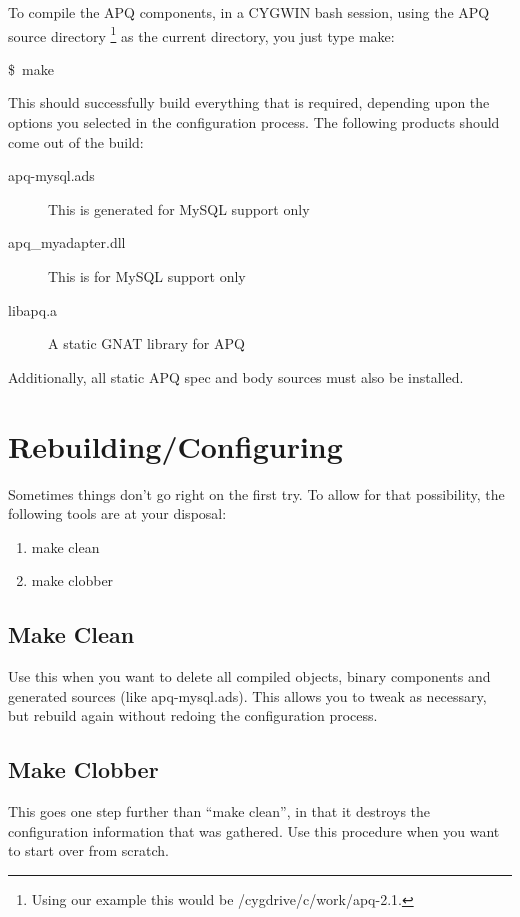 \documentclass[english]{report}
\newenvironment{lyxcode}
   {\begin{list}{}{
     \setlength{\rightmargin}{\leftmargin}
     \setlength{\listparindent}{0pt}%
     \raggedright
     \setlength{\itemsep}{0pt}
     \setlength{\parsep}{0pt}
     \normalfont\ttfamily}%
    \item[]}
   {\end{list}}
\begin{document}
To compile the APQ components, in a CYGWIN bash session, using the
APQ source directory%
\footnote{Using our example this would be /cygdrive/c/work/apq-2.1.%
} as the current directory, you just type make:

\begin{lyxcode}
\$~make
\end{lyxcode}
This should successfully build everything that is required, depending
upon the options you selected in the configuration process. The following
products should come out of the build:

\begin{description}
\item [apq-mysql.ads]This is generated for MySQL support only
\item [apq\_myadapter.dll]This is for MySQL support only
\item [libapq.a]A static GNAT library for APQ
\end{description}
Additionally, all static APQ spec and body sources must also be installed.


\section{Rebuilding/Configuring}

Sometimes things don't go right on the first try. To allow for that
possibility, the following tools are at your disposal:

\begin{enumerate}
\item make clean
\item make clobber
\end{enumerate}

\subsection{Make Clean}

Use this when you want to delete all compiled objects, binary components
and generated sources (like apq-mysql.ads). This allows you to tweak
as necessary, but rebuild again without redoing the configuration
process.


\subsection{Make Clobber}

This goes one step further than {}``make clean'', in that it destroys
the configuration information that was gathered. Use this procedure
when you want to start over from scratch.
\end{document}
